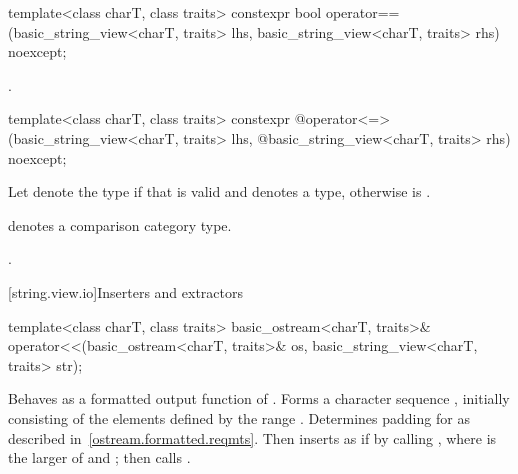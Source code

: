 %
\begin{itemdecl}
template<class charT, class traits>
  constexpr bool operator==(basic_string_view<charT, traits> lhs,
                            basic_string_view<charT, traits> rhs) noexcept;
\end{itemdecl}

\begin{itemdescr}
\pnum
\returns
{}.
\end{itemdescr}

%
\begin{itemdecl}
template<class charT, class traits>
  constexpr @\seebelow@ operator<=>(basic_string_view<charT, traits> lhs,
            @\itcorr@                      basic_string_view<charT, traits> rhs) noexcept;
\end{itemdecl}

\begin{itemdescr}
\pnum
Let  denote the type  if
that  is valid and denotes a type,
otherwise  is .

\pnum
\mandates
{} denotes a comparison category type.

\pnum
\returns
{}.
\end{itemdescr}

[string.view.io]{Inserters and extractors}

%
\begin{itemdecl}
template<class charT, class traits>
  basic_ostream<charT, traits>&
    operator<<(basic_ostream<charT, traits>& os, basic_string_view<charT, traits> str);
\end{itemdecl}

\begin{itemdescr}
\pnum
\effects
Behaves as a formatted output
function of . Forms a character sequence
, initially consisting of the elements defined by the range
. Determines padding for 
as described in~\ref{ostream.formatted.reqmts}.
Then inserts  as if by calling
, where  is the larger
of  and ;
then calls .

\pnum
\returns
{}
\end{itemdescr}

